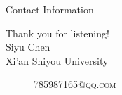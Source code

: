 \documentclass[
 size=14pt,
 paper=smartboard,  %
 mode=present, 		%
 display=slides, 	%
 style=tuliplab,  	%
 pauseslide,
 fleqn,leqno]{powerdot}
\begin{document}
\begin{wideslide}[toc=,bm=]{Contact Information}
\centering
{}
\twocolumn[
lcolwidth=0.35\linewidth,
rcolwidth=0.65\linewidth
]
{
}
{
Thank you for listening!\\
Siyu Chen\\
Xi'an Shiyou University\\
\begin{description}
 \item[\textcolor{orange}{\faEnvelope}] \href{mailto:785987165@qq.com}
 {\textsc{\footnotesize{785987165@qq.com}}}

 
\end{description}
}
\end{wideslide}
\end{document}
